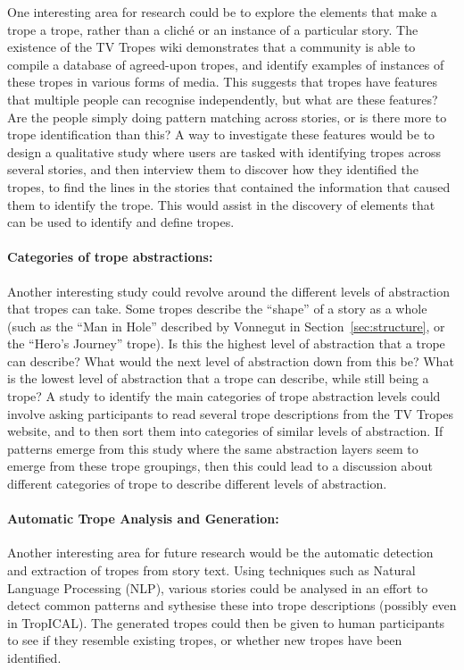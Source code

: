 \documentclass[11pt]{report}
\begin{document}
One interesting area for research could be to explore the elements that make a
trope a trope, rather than a clich\'e or an instance of a particular story. The
existence of the TV Tropes wiki demonstrates that a community is able to compile
a database of agreed-upon tropes, and identify examples of instances of these
tropes in various forms of media. This suggests that tropes have features that
multiple people can recognise independently, but what are these features? Are
the people simply doing pattern matching across stories, or is there more to
trope identification than this?
A way to investigate these features would be to design a qualitative study where
users are tasked with identifying tropes across several stories, and then
interview them to discover how they identified the tropes, to find the lines in
the stories that contained the information that caused them to identify the
trope. This would assist in the discovery of elements that can be used to
identify and define tropes.

\paragraph{Categories of trope abstractions:} Another interesting study could
revolve around the different levels of abstraction that tropes can take. Some
tropes describe the ``shape'' of a story as a whole (such as the ``Man in Hole''
described by Vonnegut in Section~\ref{sec:structure}, or the ``Hero's Journey''
trope). Is this the highest level of abstraction that a trope can describe? What
would the next level of abstraction down from this be? What is the lowest level
of abstraction that a trope can describe, while still being a trope? A study to
identify the main categories of trope abstraction levels could involve asking
participants to read several trope descriptions from the TV Tropes website, and
to then sort them into categories of similar levels of abstraction. If patterns
emerge from this study where the same abstraction layers seem to emerge from
these trope groupings, then this could lead to a discussion about different
categories of trope to describe different levels of abstraction.

\paragraph{Automatic Trope Analysis and Generation:} Another interesting area for future research would be the automatic detection
and extraction of tropes from story text. Using techniques such as Natural
Language Processing (NLP), various stories could be analysed in an effort to
detect common patterns and sythesise these into trope descriptions (possibly
even in TropICAL). The generated tropes could then be given to human
participants to see if they resemble existing tropes, or whether new tropes have
been identified.
\end{document}
